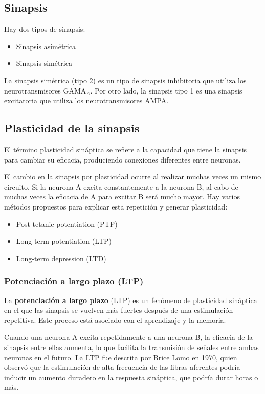 \documentclass[12pt, letterpaper]{article}
\begin{document}
\subsection{Sinapsis}
Hay dos tipos de sinapsis:
\begin{itemize}
    \item Sinapsis asimétrica
    \item Sinapsis simétrica 
\end{itemize}

La sinapsis simétrica (tipo 2) es un tipo de sinapsis inhibitoria que utiliza los neurotransmisores GAMA$_A$. Por otro lado, la sinapsis tipo 1 es una sinapsis excitatoria que utiliza los neurotransmisores AMPA.\@


\subsection{Plasticidad de la sinapsis}
El término plasticidad sináptica se refiere a la capacidad que tiene la sinapsis para cambiar su eficacia, produciendo conexiones diferentes entre neuronas.

El cambio en la sinapsis por plasticidad ocurre al realizar muchas veces un mismo circuito. Si la neurona A excita constantemente a la neurona B, al cabo de muchas veces la eficacia de A para excitar B será mucho mayor. Hay varios métodos propuestos para explicar esta repetición y generar plasticidad:
\begin{itemize}
    \item Post-tetanic potentiation (PTP)
    \item Long-term potentiation (LTP)
    \item Long-term depression (LTD)
\end{itemize}

\subsubsection{Potenciación a largo plazo (LTP)}
La \textbf{potenciación a largo plazo} (LTP) es un fenómeno de plasticidad sináptica en el que las sinapsis se vuelven más fuertes después de una estimulación repetitiva. Este proceso está asociado con el aprendizaje y la memoria.

Cuando una neurona A excita repetidamente a una neurona B, la eficacia de la sinapsis entre ellas aumenta, lo que facilita la transmisión de señales entre ambas neuronas en el futuro. La LTP fue descrita por Brice Lomo en 1970, quien observó que la estimulación de alta frecuencia de las fibras aferentes podría inducir un aumento duradero en la respuesta sináptica, que podría durar horas o más.
\end{document}

